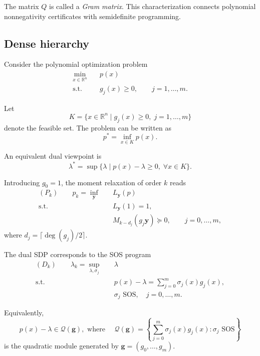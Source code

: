 \documentclass[11pt,a4paper]{article}
\theoremstyle{definition}
\begin{document}
The matrix $Q$ is called a \emph{Gram matrix}. This characterization
connects polynomial nonnegativity certificates with semidefinite
programming.


\subsection{Dense hierarchy}

Consider the polynomial optimization problem
\begin{equation}
\begin{aligned}
\min_{x\in\mathbb{R}^n} \quad & p(x) \\
\text{s.t.}\quad & g_j(x)\ge0, \qquad j=1,\dots,m .
\label{eq:pop}
\end{aligned}
\end{equation}

Let
\[
K=\{x\in\mathbb{R}^n \mid g_j(x)\ge0,
\; j=1,\dots,m\}
\]
denote the feasible set.
The problem can be written as
\begin{equation}
p^*=\inf_{x\in K} p(x).
\end{equation}

An equivalent dual viewpoint is
\begin{equation}
\lambda^*=\sup\{\lambda \mid p(x)-\lambda \ge0,
\;\forall x\in K\}.
\end{equation}

Introducing $g_0=1$, the moment relaxation of order $k$ reads
\begin{equation}
\begin{aligned}
(P_k)\qquad
p_k=\inf_{\mathbf{y}} \quad & L_{\mathbf{y}}(p) \\
\text{s.t.}\quad
& L_{\mathbf{y}}(1)=1, \\
& M_{k-d_j}(g_j\mathbf{y})\succeq0, \qquad j=0,\dots,m ,
\end{aligned}
\end{equation}
where $d_j=\lceil\deg(g_j)/2\rceil$.

The dual SDP corresponds to the SOS program
\begin{equation}
\begin{aligned}
(D_k)\qquad
\lambda_k=\sup_{\lambda,\sigma_j} \quad & \lambda \\
\text{s.t.}\quad
& p(x)-\lambda
=
\sum_{j=0}^m \sigma_j(x)g_j(x), \\
& \sigma_j \text{ SOS}, \quad j=0,\dots,m .
\end{aligned}
\end{equation}

Equivalently,
\[
p(x)-\lambda \in \mathcal{Q}(\mathbf{g}),  \text{ where } \quad
\mathcal{Q}(\mathbf{g})
=
\left\{
\sum_{j=0}^m \sigma_j(x)g_j(x)
:\sigma_j \text{ SOS}
\right\}
\]
is the quadratic module generated by $\mathbf{g}=(g_0,\ldots, g_m)$.
\end{document}
